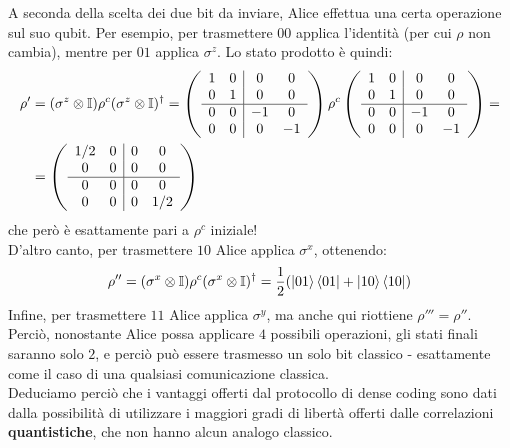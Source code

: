 \documentclass[../../InformazioneQuantistica.tex]{subfiles}
\begin{document}
A seconda della scelta dei due bit da inviare, Alice effettua una certa operazione sul suo qubit. Per esempio, per trasmettere $00$ applica l'identità (per cui $\rho$ non cambia), mentre per $01$ applica $\sigma^z$. Lo stato prodotto è quindi:
\begin{align*}
\rho' &= (\sigma^z \otimes \mathbb{I}) \rho^c (\sigma^z \otimes \mathbb{I})^\dag =
\left( \begin{array}{cc|cc} 1 & 0 & 0 & 0\\ 0 & 1 & 0 & 0 \\ \hline 
0 & 0 & -1 & 0\\
0 & 0 & 0 & -1 \end{array}\right)\rho^c \left( \begin{array}{cc|cc} 1 & 0 & 0 & 0\\ 0 & 1 & 0 & 0 \\ \hline 
0 & 0 & -1 & 0\\
0 & 0 & 0 & -1 \end{array}\right)=\\
&= \left(\begin{array}{cc|cc}1/2 & 0 & 0 & 0\\
0 & 0 & 0 & 0\\ \hline
0 & 0 & 0 & 0\\
0 & 0 & 0 & 1/2 \end{array}\right)
\end{align*}
che però è esattamente pari a $\rho^c$ iniziale!\\

D'altro canto, per trasmettere $10$ Alice applica $\sigma^x$, ottenendo:
\begin{align*}
\rho'' = (\sigma^x \otimes \mathbb{I})\rho^c (\sigma^x \otimes \mathbb{I})^\dag = \frac{1}{2}(\Ket{01}\Bra{01}+ \Ket{10}\Bra{10})
\end{align*}
Infine, per trasmettere $11$ Alice applica $\sigma^y$, ma anche qui riottiene $\rho''' = \rho''$.\\

Perciò, nonostante Alice possa applicare $4$ possibili operazioni, gli stati finali saranno solo $2$, e perciò può essere trasmesso un solo bit classico - esattamente come il caso di una qualsiasi comunicazione classica.\\
Deduciamo perciò che i vantaggi offerti dal protocollo di dense coding sono dati dalla possibilità di utilizzare i maggiori gradi di libertà offerti dalle correlazioni \textbf{quantistiche}, che non hanno alcun analogo classico.
\end{document}
